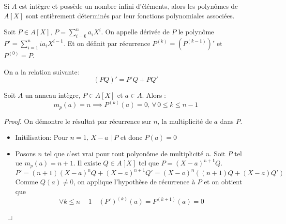 \begin{coro}
	Si $A$ est intègre et possède un nombre infini d'éléments, alors les polynômes de $A[X]$ sont entièrement déterminés par leur fonctions polynomiales associées.
\end{coro}

\begin{definition}

	Soit $P \in A[X]$, $P = \sum\limits_{i=0}^n a_iX^i$.
	On appelle dérivée de $P$ le polynôme $P' = \sum\limits_{i=1}^n ia_iX^{i-1}$.
	Et on définit par récurrence $P^{(k)} = (P^{(k-1)})'$ et $P^{(0)} = P$.
\end{definition}

\begin{prop}
	On a la relation suivante:
	$$ (PQ)' = P'Q + PQ' $$
\end{prop}

\begin{lemma}
	Soit $A$ un anneau intègre, $P \in A[X]$ et $a \in A$.
	Alors :
	$$ m_p(a) = n \implies P^{(k)}(a) = 0 , \, \forall\, 0 \leq k \leq n-1$$
\end{lemma}

\begin{proof}
	On démontre le résultat par récurrence sur $n$, la multiplicité de $a$ dans $P$.
	\begin{itemize}
		\item Initilisation: Pour $n = 1$, $X-a \mid P$ et donc $P(a) = 0$
		\item Posons $n$ tel que c'est vrai pour tout polyonôme de multiplicité $n$.
		      Soit $P$ tel ue $m_p(a) = n+1$. Il existe $Q \in A[X]$ tel que $P = (X-a)^{n+1}Q$.
		      $$P' = (n+1)(X-a)^nQ + (X-a)^{n+1}Q' = (X-a)^n((n+1)Q + (X-a)Q')$$
		      Comme $Q(a) \neq 0$, on applique l'hypothèse de récurrence à $P$ et on obtient que
		      $$ \forall k \leq n-1 \quad (P')^{(k)}(a) = P^{(k+1)}(a) = 0 $$
	\end{itemize}
\end{proof}


